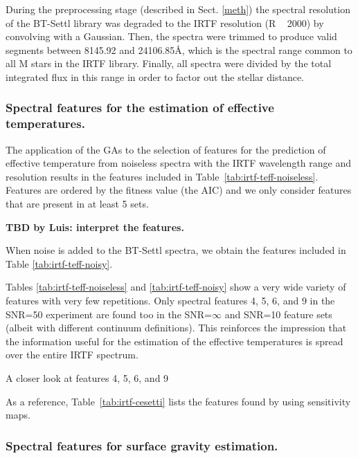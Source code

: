
During the preprocessing stage (described in Sect. \ref{meth}) the
spectral resolution of the BT-Settl library was degraded to the IRTF
resolution (R ~ 2000) by convolving with a Gaussian. Then, the spectra
were trimmed to produce valid segments between 8145.92 and
24106.85{\AA}, which is the spectral range common to all M stars in
the IRTF library. Finally, all spectra were divided by the total
integrated flux in this range in order to factor out the stellar
distance.

\subsubsection{Spectral features for the estimation of effective temperatures.}

The application of the GAs to the selection of features for the
prediction of effective temperature from noiseless spectra with the
IRTF wavelength range and resolution results in the features included
in Table~\ref{tab:irtf-teff-noiseless}. Features are ordered by the
fitness value (the AIC) and we only consider features that are present
in at least 5 sets.

{\bf TBD by Luis: interpret the features.}

When noise is added to the BT-Settl spectra, we obtain the features included in Table \ref{tab:irtf-teff-noisy}.


Tables \ref{tab:irtf-teff-noiseless} and \ref{tab:irtf-teff-noisy}
show a very wide variety of features with very few repetitions. Only
spectral features 4, 5, 6, and 9 in the SNR=50 experiment are found
too in the SNR=$\infty$ and SNR=10 feature sets (albeit with different
continuum definitions). This reinforces the impression that the
information useful for the estimation of the effective temperatures is
spread over the entire IRTF spectrum.

A closer look at features 4, 5, 6, and 9 

As a reference, Table~\ref{tab:irtf-cesetti} lists the features found
by \cite{cesetti} using sensitivity maps.


\subsubsection{Spectral features for surface gravity estimation.}

